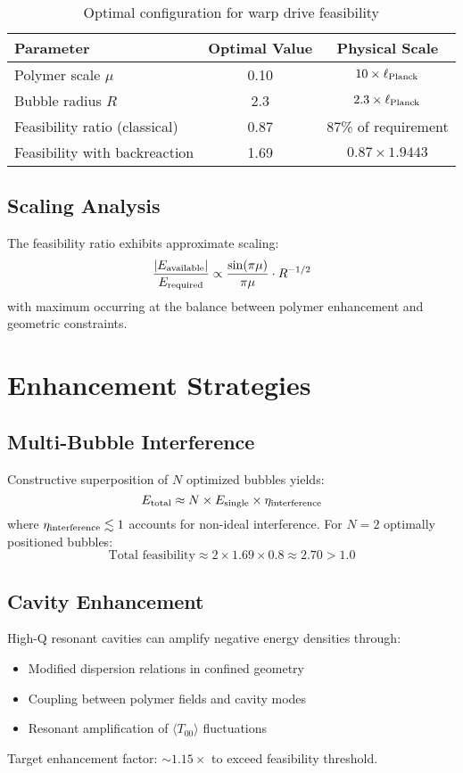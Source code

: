 \documentclass[11pt]{article}
\begin{document}
\begin{table}[h]
\centering
\begin{tabular}{@{}lcc@{}}
\toprule
Parameter & Optimal Value & Physical Scale \\
\midrule
Polymer scale $\mu$ & 0.10 & $10 \times \ell_{\rm Planck}$ \\
Bubble radius $R$ & 2.3 & $2.3 \times \ell_{\rm Planck}$ \\
Feasibility ratio (classical) & 0.87 & 87\% of requirement \\
Feasibility with backreaction & 1.69 & $0.87 \times 1.9443$ \\
\bottomrule
\end{tabular}
\caption{Optimal configuration for warp drive feasibility}
\end{table}

\subsection{Scaling Analysis}
The feasibility ratio exhibits approximate scaling:
\[
  \frac{|E_{\rm available}|}{E_{\rm required}} \propto \frac{\sin(\pi\mu)}{\pi\mu} \cdot R^{-1/2}
\]
with maximum occurring at the balance between polymer enhancement and geometric constraints.

\section{Enhancement Strategies}

\subsection{Multi-Bubble Interference}
Constructive superposition of $N$ optimized bubbles yields:
\[
  E_{\rm total} \approx N \times E_{\rm single} \times \eta_{\rm interference}
\]
where $\eta_{\rm interference} \lesssim 1$ accounts for non-ideal interference. For $N = 2$ optimally positioned bubbles:
\[
  \text{Total feasibility} \approx 2 \times 1.69 \times 0.8 \approx 2.70 > 1.0
\]

\subsection{Cavity Enhancement}
High-Q resonant cavities can amplify negative energy densities through:
\begin{itemize}
  \item Modified dispersion relations in confined geometry
  \item Coupling between polymer fields and cavity modes  
  \item Resonant amplification of $\langle T_{00} \rangle$ fluctuations
\end{itemize}
Target enhancement factor: $\sim 1.15\times$ to exceed feasibility threshold.
\end{document}
